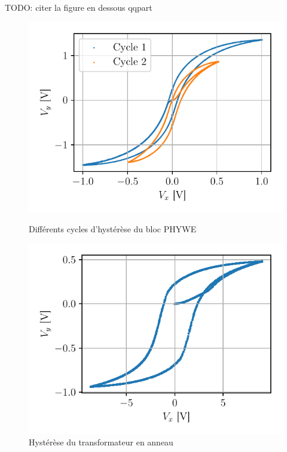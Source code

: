 TODO: citer la figure en dessous qqpart
\begin{figure}[h]
    \begin{minipage}{0.48\linewidth}
        \centering
        \includegraphics[width=\linewidth]{figures/phywe_autres_cycles.pdf}
        \caption{Différents cycles d'hystérèse du bloc PHYWE}
        \label{fig:autres_cycles}
    \end{minipage}
    \hfill
    \begin{minipage}{0.48\linewidth}
        \centering
        \includegraphics[width=\linewidth]{figures/G1-anneau.pdf}
        \caption{Hystérèse du transformateur en anneau}
        \label{fig:anneau}
    \end{minipage}
\end{figure}

